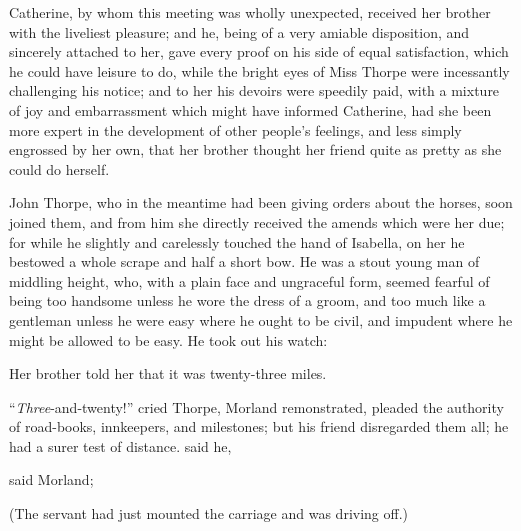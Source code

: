 Catherine, by whom this meeting was wholly unexpected, received her brother with the liveliest pleasure; and he, being of a very amiable disposition, and sincerely attached to her, gave every proof on his side of equal satisfaction, which he could have leisure to do, while the bright eyes of Miss Thorpe were incessantly challenging his notice; and to her his devoirs were speedily paid, with a mixture of joy and embarrassment which might have informed Catherine, had she been more expert in the development of other people's feelings, and less simply engrossed by her own, that her brother thought her friend quite as pretty as she could do herself.

John Thorpe, who in the meantime had been giving orders about the horses, soon joined them, and from him she directly received the amends which were her due; for while he slightly and carelessly touched the hand of Isabella, on her he bestowed a whole scrape and half a short bow. He was a stout young man of middling height, who, with a plain face and ungraceful form, seemed fearful of being too handsome unless he wore the dress of a groom, and too much like a gentleman unless he were easy where he ought to be civil, and impudent where he might be allowed to be easy. He took out his watch: 

 Her brother told her that it was twenty-three miles.

“{\em Three}-and-twenty!” cried Thorpe,  Morland remonstrated, pleaded the authority of road-books, innkeepers, and milestones; but his friend disregarded them all; he had a surer test of distance.  said he, 

 said Morland; 

 (The servant had just mounted the carriage and was driving off.) 

